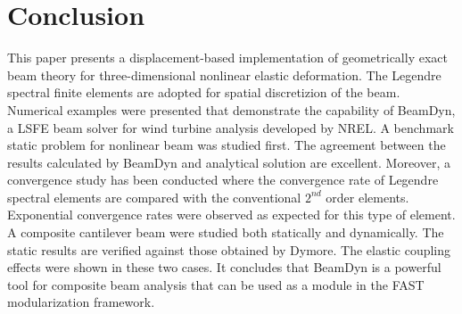 \section{Conclusion}


This paper presents a displacement-based implementation of geometrically
exact beam theory for three-dimensional nonlinear elastic deformation. The
Legendre spectral finite elements are adopted for spatial discretizion of
the beam. Numerical examples were presented that demonstrate the capability
of BeamDyn, a LSFE beam solver for wind turbine analysis developed by NREL. A benchmark static problem for nonlinear beam was studied first. The agreement between the results calculated by BeamDyn and analytical solution are excellent. Moreover, a convergence study has been conducted where the convergence rate of Legendre spectral elements are compared with the conventional $2^{nd}$ order elements. Exponential convergence rates were observed as expected for this type of element. A composite cantilever beam were studied both statically and dynamically. The static results are verified against those obtained by Dymore. The elastic coupling effects were shown in these two cases. It concludes that BeamDyn is a powerful tool for composite beam analysis that can be used as a module in the FAST modularization framework.

